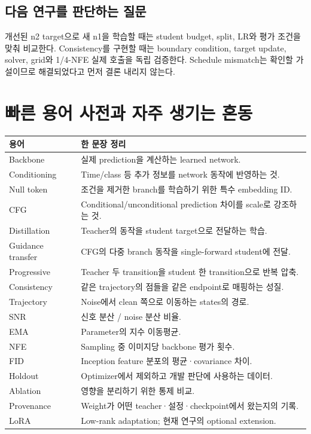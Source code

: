 \documentclass[11pt,a4paper]{article}
\begin{document}
\subsection{다음 연구를 판단하는 질문}
개선된 n2 target으로 새 n1을 학습할 때는 student budget, split, LR와 평가 조건을 맞춰 비교한다. Consistency를 구현할 때는 boundary condition, target update, solver, grid와 1/4-NFE 실제 호출을 독립 검증한다. Schedule mismatch는 확인할 가설이므로 해결되었다고 먼저 결론 내리지 않는다.

\section{빠른 용어 사전과 자주 생기는 혼동}
\par\noindent
\begin{tabularx}{\linewidth}{lY}
\toprule 용어 & 한 문장 정리 \\\midrule
Backbone & 실제 prediction을 계산하는 learned network. \\
Conditioning & Time/class 등 추가 정보를 network 동작에 반영하는 것. \\
Null token & 조건을 제거한 branch를 학습하기 위한 특수 embedding ID. \\
CFG & Conditional/unconditional prediction 차이를 scale로 강조하는 것. \\
Distillation & Teacher의 동작을 student target으로 전달하는 학습. \\
Guidance transfer & CFG의 다중 branch 동작을 single-forward student에 전달. \\
Progressive & Teacher 두 transition을 student 한 transition으로 반복 압축. \\
Consistency & 같은 trajectory의 점들을 같은 endpoint로 매핑하는 성질. \\
Trajectory & Noise에서 clean 쪽으로 이동하는 states의 경로. \\
SNR & 신호 분산 / noise 분산 비율. \\
EMA & Parameter의 지수 이동평균. \\
NFE & Sampling 중 이미지당 backbone 평가 횟수. \\
FID & Inception feature 분포의 평균·covariance 차이. \\
Holdout & Optimizer에서 제외하고 개발 판단에 사용하는 데이터. \\
Ablation & 영향을 분리하기 위한 통제 비교. \\
Provenance & Weight가 어떤 teacher·설정·checkpoint에서 왔는지의 기록. \\
LoRA & Low-rank adaptation; 현재 연구의 optional extension. \\
\bottomrule
\end{tabularx}
\par
\end{document}
